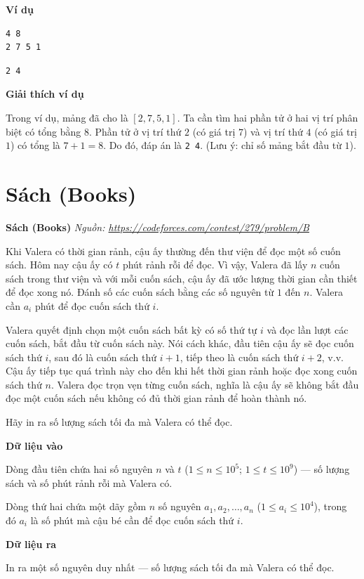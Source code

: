 \documentclass[12pt,a4paper]{article}
\newcommand{\problem}[2]{%
  \begin{mdframed}[
    linecolor=framecolor,
    linewidth=1.5pt,
    backgroundcolor=white,
    topline=true, bottomline=true,
    leftline=true, rightline=true,
    innerleftmargin=10pt, innerrightmargin=10pt,
    innertopmargin=6pt, innerbottommargin=6pt,
  ]
  \textbf{\large #1} \hfill \textit{Nguồn: #2}
  \end{mdframed}
  \vspace{4pt}%
}
\newcommand{\inputformat}{%
  \vspace{6pt}\textbf{\textcolor{sectioncolor}{Dữ liệu vào}}\par\vspace{2pt}%
}
\newcommand{\outputformat}{%
  \vspace{6pt}\textbf{\textcolor{sectioncolor}{Dữ liệu ra}}\par\vspace{2pt}%
}
\newcommand{\example}{%
  \vspace{6pt}\textbf{\textcolor{sectioncolor}{Ví dụ}}\par\vspace{2pt}%
}
\newcommand{\explanation}{%
  \vspace{6pt}\textbf{\textcolor{sectioncolor}{Giải thích ví dụ}}\par\vspace{2pt}%
}
\begin{document}
\example
\begin{lstlisting}
4 8
2 7 5 1
\end{lstlisting}
\begin{lstlisting}
2 4
\end{lstlisting}

\explanation
Trong ví dụ, mảng đã cho là $[2, 7, 5, 1]$. Ta cần tìm hai phần tử ở hai vị trí phân biệt có tổng bằng $8$.
Phần tử ở vị trí thứ $2$ (có giá trị $7$) và vị trí thứ $4$ (có giá trị $1$) có tổng là $7 + 1 = 8$.
Do đó, đáp án là \texttt{2 4}. (Lưu ý: chỉ số mảng bắt đầu từ $1$).


\section{Sách (Books)}
\problem{Sách (Books)}{\url{https://codeforces.com/contest/279/problem/B}}

Khi Valera có thời gian rảnh, cậu ấy thường đến thư viện để đọc một số cuốn sách. Hôm nay cậu ấy có $t$ phút rảnh rỗi để đọc. Vì vậy, Valera đã lấy $n$ cuốn sách trong thư viện và với mỗi cuốn sách, cậu ấy đã ước lượng thời gian cần thiết để đọc xong nó. Đánh số các cuốn sách bằng các số nguyên từ $1$ đến $n$. Valera cần $a_i$ phút để đọc cuốn sách thứ $i$.

Valera quyết định chọn một cuốn sách bất kỳ có số thứ tự $i$ và đọc lần lượt các cuốn sách, bắt đầu từ cuốn sách này. Nói cách khác, đầu tiên cậu ấy sẽ đọc cuốn sách thứ $i$, sau đó là cuốn sách thứ $i+1$, tiếp theo là cuốn sách thứ $i+2$, v.v. Cậu ấy tiếp tục quá trình này cho đến khi hết thời gian rảnh hoặc đọc xong cuốn sách thứ $n$. Valera đọc trọn vẹn từng cuốn sách, nghĩa là cậu ấy sẽ không bắt đầu đọc một cuốn sách nếu không có đủ thời gian rảnh để hoàn thành nó.

Hãy in ra số lượng sách tối đa mà Valera có thể đọc.

\inputformat
\begin{inputbox}
Dòng đầu tiên chứa hai số nguyên $n$ và $t$ ($1 \le n \le 10^5$; $1 \le t \le 10^9$) — số lượng sách và số phút rảnh rỗi mà Valera có.

Dòng thứ hai chứa một dãy gồm $n$ số nguyên $a_1, a_2, \dots, a_n$ ($1 \le a_i \le 10^4$), trong đó $a_i$ là số phút mà cậu bé cần để đọc cuốn sách thứ $i$.
\end{inputbox}

\outputformat
\begin{outputbox}
In ra một số nguyên duy nhất — số lượng sách tối đa mà Valera có thể đọc.
\end{outputbox}
\end{document}
